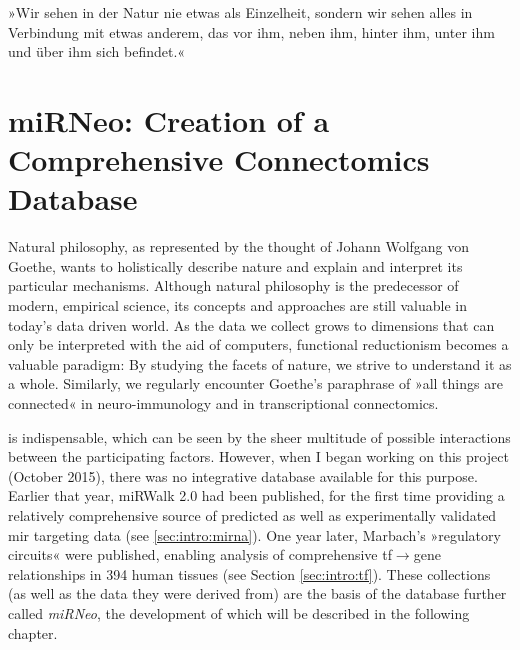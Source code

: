 %

\begin{savequote}[75mm]
»Wir sehen in der Natur nie etwas als Einzelheit, sondern wir sehen alles in Verbindung mit etwas anderem, das vor ihm, neben ihm, hinter ihm, unter ihm und über ihm sich befindet.«
\end{savequote}

\chapter[miRNeo: Creation of a Comprehensive Connectomics Database]{miRNeo: Creation of a\\Comprehensive Connectomics Database} \label{sec:database}
Natural philosophy, as represented by the thought of Johann Wolfgang von Goethe, wants to holistically describe nature and explain and interpret its particular mechanisms. Although natural philosophy is the predecessor of modern, empirical science, its concepts and approaches are still valuable in today's data driven world. As the data we collect grows to dimensions that can only be interpreted with the aid of computers, functional reductionism becomes a valuable paradigm: By studying the facets of nature, we strive to understand it as a whole. Similarly, we regularly encounter Goethe's paraphrase of »all things are connected« in neuro-immunology and in transcriptional connectomics.

 is indispensable, which can be seen by the sheer multitude of possible interactions between the participating factors. However, when I began working on this project (October 2015), there was no integrative database available for this purpose. Earlier that year, miRWalk 2.0 had been published, for the first time providing a relatively comprehensive source of predicted as well as experimentally validated \ac{mir} targeting data\cite{Dweep2015} (see \ref{sec:intro:mirna}). One year later, Marbach's »regulatory circuits« were published,\cite{Marbach2016} enabling analysis of comprehensive \ac{tf}$\to$gene relationships in 394 human tissues (see Section \ref{sec:intro:tf}). These collections (as well as the data they were derived from) are the basis of the database further called \textit{miRNeo}, the development of which will be described in the following chapter.

